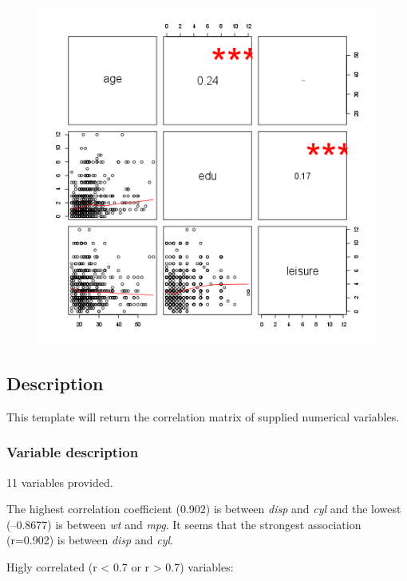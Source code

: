 \documentclass{article}
\makeatletter
\def\maxwidth{\ifdim\Gin@nat@width>\linewidth\linewidth
\else\Gin@nat@width\fi}
\let\Oldincludegraphics\includegraphics
\renewcommand{\includegraphics}[1]{\Oldincludegraphics[width=\maxwidth]{#1}}
\makeatother
\begin{document}
\begin{figure}[htbp]
\centering
\includegraphics{f4c6c0be648793b84a85d267c1a8ecd3.png}
\caption{}
\end{figure}

\subsection{Description}

This template will return the correlation matrix of supplied numerical
variables.

\subsubsection{Variable description}

11 variables provided.

The highest correlation coefficient (0.902) is between \emph{disp} and
\emph{cyl} and the lowest (--0.8677) is between \emph{wt} and
\emph{mpg}. It seems that the strongest association (r=0.902) is between
\emph{disp} and \emph{cyl}.

Higly correlated (r \textless{} 0.7 or r \textgreater{} 0.7) variables:
\end{document}
